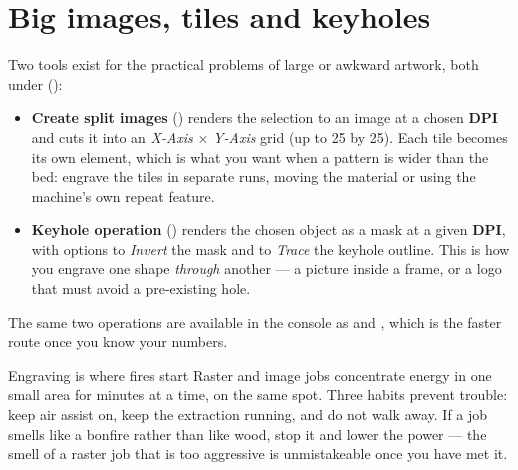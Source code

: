 \section{Big images, tiles and keyholes}

Two tools exist for the practical problems of large or awkward artwork, both
under  ():

\begin{itemize}
  \item \textbf{Create split images} () renders the
        selection to an image at a chosen \textbf{DPI} and cuts it into an
        \emph{X-Axis} $\times$ \emph{Y-Axis} grid (up to 25 by 25). Each tile
        becomes its own element, which is what you want when a pattern is wider
        than the bed: engrave the tiles in separate runs, moving the material or
        using the machine's own repeat feature.
  \item \textbf{Keyhole operation} () renders the
        chosen object as a mask at a given \textbf{DPI}, with options to
        \emph{Invert} the mask and to \emph{Trace} the keyhole outline. This is
        how you engrave one shape \emph{through} another --- a picture inside a
        frame, or a logo that must avoid a pre-existing hole.
\end{itemize}

\noindent The same two operations are available in the console as
 and , which is
the faster route once you know your numbers.

\begin{machinebox}{Engraving is where fires start}
Raster and image jobs concentrate energy in one small area for minutes at a time,
on the same spot. Three habits prevent trouble: keep air assist on, keep the
extraction running, and do not walk away. If a job smells like a bonfire rather
than like wood, stop it and lower the power --- the smell of a raster job that is
too aggressive is unmistakeable once you have met it.
\end{machinebox}

